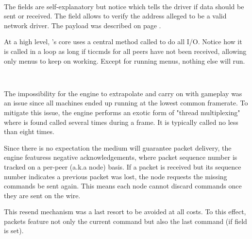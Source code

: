 \label{doomcom_t.c} \\
\par
\vspace{-10pt}
The fields are self-explanatory but notice  which tells the driver if data should be sent or received. The  field allows \doom{} to verify the address alleged to be a valid network driver. The  payload was described on page \pageref{cmd_t_type}.



At a high level, \doom{}'s core uses a central method called  to do all I/O. Notice how it is called in a loop as long if ticcmds for all peers have not been received, allowing only menus to keep on working. Except for running menus, nothing else will run.\\
\par
{}\\
\par
The impossibility for the engine to extrapolate and carry on with gameplay was an issue since all machines ended up running at the lowest common framerate. To mitigate this issue, the engine performs an exotic form of "thread multiplexing" where  is found called several times during a frame. It is typically called no less than eight times.\\
\par
{}



Since there is no expectation the medium will guarantee packet delivery, the engine featuress negative acknowledgements, where packet sequence number is tracked on a per-peer (a.k.a node) basis. If a packet is received but its sequence number indicates a previous packet was lost, the node requests the missing commands be sent again. This means each node cannot discard commands once they are sent on the wire.\\
\par
This resend mechanism was a last resort to be avoided at all costs. To this effect, packets feature not only the current command but also the last command (if field  is set).\\





